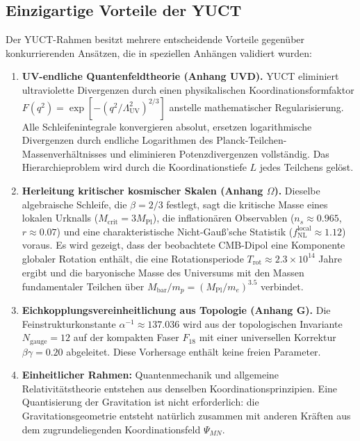 \documentclass[12pt,a4paper]{article}
\theoremstyle{remark}
\begin{document}
	\subsection{Einzigartige Vorteile der YUCT}
	
	Der YUCT-Rahmen besitzt mehrere entscheidende Vorteile gegenüber konkurrierenden Ansätzen, die in speziellen Anhängen validiert wurden:
	
	\begin{enumerate}
		\item \textbf{UV-endliche Quantenfeldtheorie (Anhang UVD).}
		YUCT eliminiert ultraviolette Divergenzen durch einen physikalischen Koordinationsformfaktor $F(q^2)=\exp[-(q^2/\Lambda_{\mathrm{UV}}^2)^{2/3}]$ anstelle mathematischer Regularisierung. Alle Schleifenintegrale konvergieren absolut, ersetzen logarithmische Divergenzen durch endliche Logarithmen des Planck-Teilchen-Massenverhältnisses und eliminieren Potenzdivergenzen vollständig. Das Hierarchieproblem wird durch die Koordinationstiefe $L$ jedes Teilchens gelöst.
		
		\item \textbf{Herleitung kritischer kosmischer Skalen (Anhang $\Omega$).}
		Dieselbe algebraische Schleife, die $\beta=2/3$ festlegt, sagt die kritische Masse eines lokalen Urknalls ($M_{\mathrm{crit}}=3M_{\mathrm{Pl}}$), die inflationären Observablen ($n_s\approx0.965$, $r\approx0.07$) und eine charakteristische Nicht-Gauß'sche Statistik ($f_{\mathrm{NL}}^{\mathrm{local}}\approx1.12$) voraus. Es wird gezeigt, dass der beobachtete CMB-Dipol eine Komponente globaler Rotation enthält, die eine Rotationsperiode $T_{\mathrm{rot}}\approx2.3\times10^{14}$ Jahre ergibt und die baryonische Masse des Universums mit den Massen fundamentaler Teilchen über $M_{\mathrm{bar}}/m_p=(M_{\mathrm{Pl}}/m_e)^{3.5}$ verbindet.
		
		\item \textbf{Eichkopplungsvereinheitlichung aus Topologie (Anhang G).}
		Die Feinstrukturkonstante $\alpha^{-1}\approx137.036$ wird aus der topologischen Invariante $N_{\mathrm{gauge}}=12$ auf der kompakten Faser $F_{18}$ mit einer universellen Korrektur $\beta\gamma=0.20$ abgeleitet. Diese Vorhersage enthält keine freien Parameter.
		
		\item \textbf{Einheitlicher Rahmen:} Quantenmechanik und allgemeine Relativitätstheorie entstehen aus denselben Koordinationsprinzipien. Eine Quantisierung der Gravitation ist nicht erforderlich: die Gravitationsgeometrie entsteht natürlich zusammen mit anderen Kräften aus dem zugrundeliegenden Koordinationsfeld $\Psi_{MN}$.
		

\end{enumerate}
\end{document}
